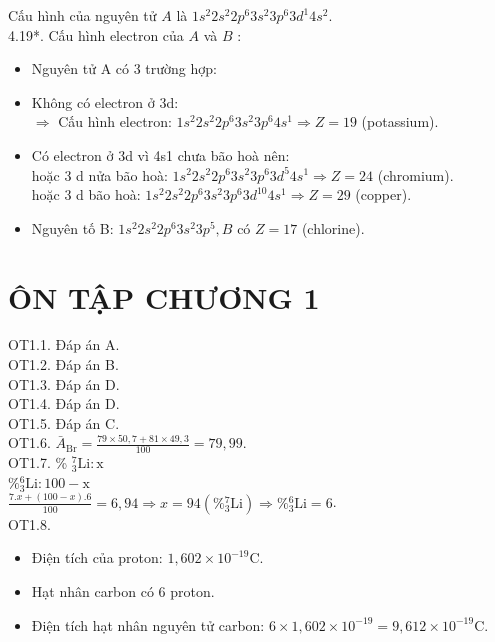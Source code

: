 \documentclass[10pt]{article}
\begin{document}
Cấu hình của nguyên tử $A$ là $1 s^{2} 2 s^{2} 2 p^{6} 3 s^{2} 3 p^{6} 3 d^{1} 4 s^{2}$.\\
4.19*. Cấu hình electron của $A$ và $B$ :

\begin{itemize}
  \item Nguyên tử A có 3 trường hợp:
\end{itemize}

\begin{itemize}
  \item Không có electron ở 3d:\\
$\Rightarrow$ Cấu hình electron: $1 s^{2} 2 s^{2} 2 p^{6} 3 s^{2} 3 p^{6} 4 s^{1} \Rightarrow Z=19$ (potassium).
  \item Có electron ở 3d vì 4s1 chưa bão hoà nên:\\
hoặc 3 d nửa bão hoà: $1 s^{2} 2 s^{2} 2 p^{6} 3 s^{2} 3 p^{6} 3 d^{5} 4 s^{1} \Rightarrow Z=24$ (chromium).\\
hoặc 3 d bão hoà: $1 s^{2} 2 s^{2} 2 p^{6} 3 s^{2} 3 p^{6} 3 d^{10} 4 s^{1} \Rightarrow Z=29$ (copper).
\end{itemize}

\begin{itemize}
  \item Nguyên tố B: $1 s^{2} 2 s^{2} 2 p^{6} 3 s^{2} 3 p^{5}, B$ có $Z=17$ (chlorine).
\end{itemize}

\section*{ÔN TẬP CHƯƠNG 1}
OT1.1. Đáp án A.\\
OT1.2. Đáp án B.\\
OT1.3. Đáp án D.\\
OT1.4. Đáp án D.\\
OT1.5. Đáp án C.\\
OT1.6. $\bar{A}_{\mathrm{Br}}=\frac{79 \times 50,7+81 \times 49,3}{100}=79,99$.\\
OT1.7. \% ${ }_{3}^{7} \mathrm{Li}: \mathrm{x}$\\
$\%{ }_{3}^{6} \mathrm{Li}: 100-\mathrm{x}$\\
$\frac{7 . x+(100-x) .6}{100}=6,94 \Rightarrow x=94\left(\%{ }_{3}^{7} \mathrm{Li}\right) \Rightarrow \%{ }_{3}^{6} \mathrm{Li}=6$.\\
OT1.8.

\begin{itemize}
  \item Điện tích của proton: $1,602 \times 10^{-19} \mathrm{C}$.
  \item Hạt nhân carbon có 6 proton.
  \item Điện tích hạt nhân nguyên tử carbon: $6 \times 1,602 \times 10^{-19}=9,612 \times 10^{-19} \mathrm{C}$.
\end{itemize}
\end{document}
